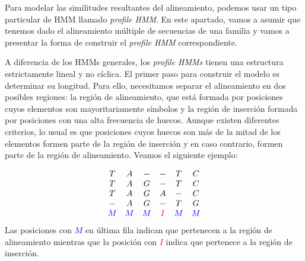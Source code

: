 Para modelar las similitudes resultantes del alineamiento, podemos usar un tipo particular de HMM llamado \textit{profile HMM}. En este apartado, vamos a asumir que tenemos dado el alineamiento múltiple de secuencias de una familia y vamos a presentar la forma de construir el \textit{profile HMM} correspondiente. 

A diferencia de los HMMs generales, los \textit{profile HMMs} tienen una estructura estrictamente lineal y no cíclica. El primer paso para construir el modelo es determinar su longitud. Para ello, necesitamos separar el alineamiento en dos posibles regiones: la región de alineamiento, que está formada por posiciones cuyos elementos son mayoritariamente símbolos y la región de inserción formada por posiciones con una alta frecuencia de huecos. Aunque existen diferentes criterios, lo usual es que posiciones cuyos huecos son más de la mitad de los elementos formen parte de la región de inserción y en caso contrario, formen parte de la región de alineamiento. Veamos el siguiente ejemplo:

\begin{exampleth} \label{alineamientoMúltiple}
    \[\begin{array}{c c c c c c}
        T & A & - & -  & T & C \\
        T & A & G & -  & T & C \\
        T & A & G & A  & - & C \\
        - & A & G & -  & T & G \\
        \textcolor{blue}{M} & \textcolor{blue}{M} & \textcolor{blue}{M} & \textcolor{red}{I} & \textcolor{blue}{M} & \textcolor{blue}{M}
    \end{array}\]    
    Las posiciones con \textcolor{blue}{$M$} en última fila indican que pertenecen a la región de alineamiento mientras que la posición con \textcolor{red}{$I$} indica que pertenece a la región de inserción.
\end{exampleth}


